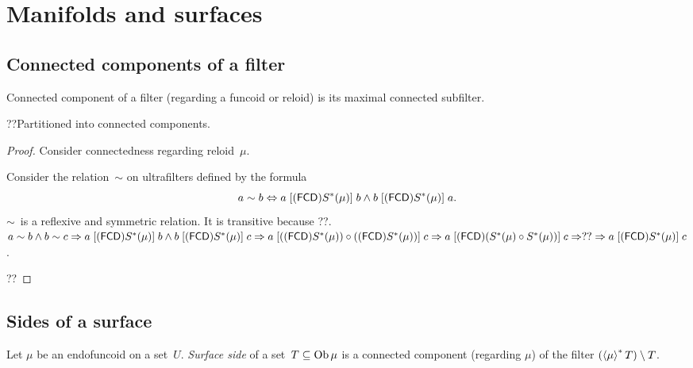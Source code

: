 \chapter{Manifolds and surfaces}

\section{Connected components of a filter}

\begin{defn}
Connected component of a filter (regarding a funcoid or reloid)
is its maximal connected subfilter.
\end{defn}

\begin{thm}
??Partitioned into connected components.
\end{thm}

\begin{proof}

Consider connectedness regarding reloid~$\mu$.

Consider the relation~$\sim$ on ultrafilters defined by the formula
\[ a\sim b\Leftrightarrow a\mathrel{\left[(\mathsf{FCD}) S^\ast(\mu)\right]}b \land
b\mathrel{\left[(\mathsf{FCD}) S^\ast(\mu)\right]}a. \]
$\sim$~is a reflexive and symmetric relation.
It is transitive because ??.
$a\sim b\land b\sim c \Rightarrow
a\mathrel{\left[(\mathsf{FCD}) S^\ast(\mu)\right]}b \land b\mathrel{\left[(\mathsf{FCD}) S^\ast(\mu)\right]}c
\Rightarrow
a\mathrel{\left[((\mathsf{FCD}) S^\ast(\mu))\circ((\mathsf{FCD}) S^\ast(\mu))\right]}c
\Rightarrow
a\mathrel{\left[(\mathsf{FCD})(S^\ast(\mu)\circ S^\ast(\mu))\right]}c
\Rightarrow??\Rightarrow
a\mathrel{\left[(\mathsf{FCD}) S^\ast(\mu)\right]}c$.

??
\end{proof}


\section{Sides of a surface}

\begin{defn}
Let $\mu$ be an endofuncoid on a set~$U$.
\emph{Surface side} of a set~$T\subseteq\operatorname{Ob}\mu$ is a connected component
(regarding $\mu$) of the filter $(\left\langle \mu\right\rangle ^{\ast}T)\setminus T$.
\end{defn}

